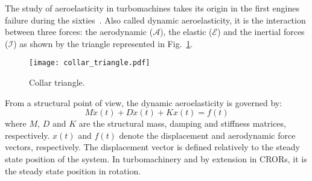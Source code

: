 
The study of aeroelasticity in turbomachines takes its origin
in the first engines failure during the sixties~\cite{Dugundji2003}.
Also called dynamic aeroelasticity,
it is the interaction between three forces:
the aerodynamic ($\mathcal{A}$), the elastic ($\mathcal{E}$) and
the inertial forces ($\mathcal{I}$) as 
shown by the \citet{Collar1946} triangle represented in 
Fig.~\ref{fig:ael_collar_triangle}. 
\begin{figure}[htp]
  \centering
  \texttt{[image: collar\_triangle.pdf]}
  \caption{Collar triangle.}
  \label{fig:ael_collar_triangle}
\end{figure}

From a structural point of view, 
the dynamic aeroelasticity is governed by:
\begin{equation}
	M \ddot{x}(t) + D \dot{x}(t) + K x(t) = f(t)
	\label{eq:ael_motion_eq}
\end{equation}
where $M$, $D$ and $K$ are the structural mass, damping 
and stiffness matrices, respectively.
$x(t)$ and $f(t)$ denote the displacement 
and aerodynamic force vectors, respectively. The displacement
vector is defined relatively to the 
steady state position of the system. In turbomachinery
and by extension in CRORs, it is the steady state position
in rotation.
